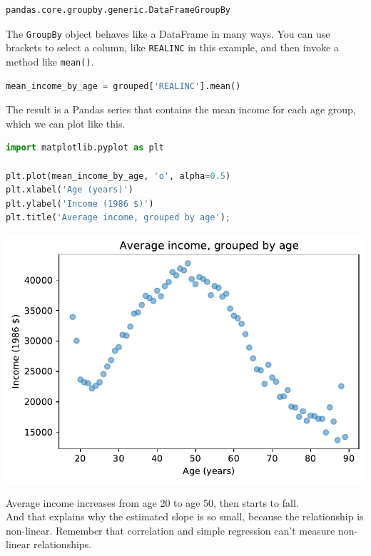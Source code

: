 \begin{lstlisting}[style=output]
pandas.core.groupby.generic.DataFrameGroupBy
\end{lstlisting}

The \passthrough{\lstinline!GroupBy!} object behaves like a DataFrame in
many ways. You can use brackets to select a column, like
\passthrough{\lstinline!REALINC!} in this example, and then invoke a
method like \passthrough{\lstinline!mean()!}.

\begin{lstlisting}[language=Python,style=source]
mean_income_by_age = grouped['REALINC'].mean()
\end{lstlisting}

The result is a Pandas series that contains the mean income for each age
group, which we can plot like this.

\begin{lstlisting}[language=Python,style=source]
import matplotlib.pyplot as plt

plt.plot(mean_income_by_age, 'o', alpha=0.5)
plt.xlabel('Age (years)')
plt.ylabel('Income (1986 $)')
plt.title('Average income, grouped by age');
\end{lstlisting}

\begin{center}
\includegraphics[scale=0.75]{10_regression_files/10_regression_36_0.pdf}
\end{center}

Average income increases from age 20 to age 50, then starts to fall.\\
And that explains why the estimated slope is so small, because the
relationship is non-linear. Remember that correlation and simple
regression can't measure non-linear relationships.

